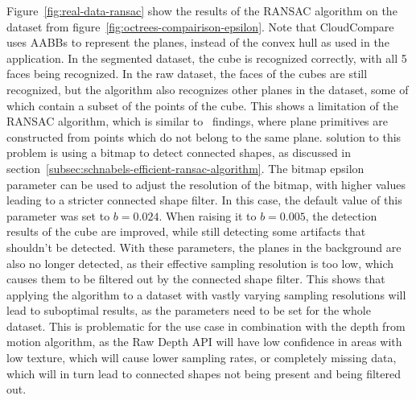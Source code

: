 Figure~\ref{fig:real-data-ransac} show the results of the RANSAC algorithm on the dataset from figure~\ref{fig:octrees-compairison-epsilon}.
Note that CloudCompare uses AABBs to represent the planes, instead of the convex hull as used in the application.
In the segmented dataset, the cube is recognized correctly, with all 5 faces being recognized.
In the raw dataset, the faces of the cubes are still recognized, but the algorithm also recognizes other planes in the dataset,
some of which contain a subset of the points of the cube.
This shows a limitation of the RANSAC algorithm, which is similar to~\cite{tarsha-kurdi_hough-transform_2007} findings,
where plane primitives are constructed from points which do not belong to the same plane.
\cite{schnabel_efficient_2007} solution to this problem is using a bitmap to detect connected shapes, as discussed in section~\ref{subsec:schnabels-efficient-ransac-algorithm}.
The bitmap epsilon parameter can be used to adjust the resolution of the bitmap, with higher values leading to a stricter connected shape filter.
In this case, the default value of this parameter was set to $b=0.024$.
When raising it to $b=0.005$, the detection results of the cube are improved,
while still detecting some artifacts that shouldn't be detected.
With these parameters, the planes in the background are also no longer detected,
as their effective sampling resolution is too low, which causes them to be filtered out by the connected shape filter.
This shows that applying the algorithm to a dataset with vastly varying sampling resolutions will
lead to suboptimal results, as the parameters need to be set for the whole dataset.
This is problematic for the use case in combination with the depth from motion algorithm, as the Raw Depth API
will have low confidence in areas with low texture, which will cause lower sampling rates, or completely missing data,
which will in turn lead to connected shapes not being present and being filtered out.


